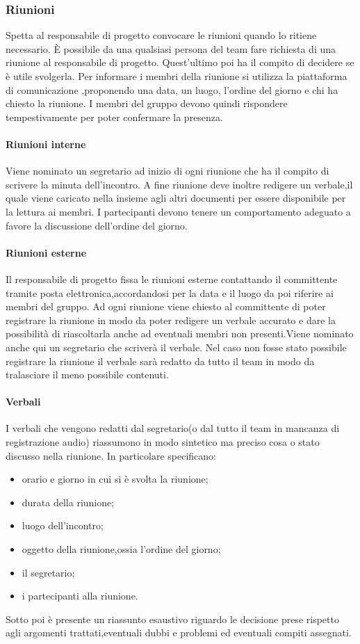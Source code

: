 \subsubsection{Riunioni}
			Spetta al responsabile di progetto convocare le riunioni quando lo ritiene necessario. È possibile da una qualsiasi persona del team fare richiesta di una riunione al responsabile di progetto. Quest'ultimo poi ha il compito di decidere se è utile svolgerla.  Per informare i membri della riunione si utilizza la piattaforma di comunicazione ,proponendo una data, un luogo, l'ordine del giorno e chi ha chiesto la riunione. I membri del gruppo devono quindi rispondere tempestivamente per poter confermare la presenza.
			\paragraph{Riunioni interne}
				Viene nominato un segretario ad inizio di ogni riunione che ha il compito di scrivere la minuta dell'incontro. A fine riunione deve inoltre redigere un verbale,il quale viene caricato nella  insieme agli altri documenti per essere disponibile per la lettura ai membri. I partecipanti devono tenere un comportamento adeguato a favore la discussione dell'ordine del giorno.
			\paragraph{Riunioni esterne}
				Il responsabile di progetto fissa le riunioni esterne contattando il committente tramite posta elettronica,accordandosi per la data e il luogo da poi riferire ai membri del gruppo.
				Ad ogni riunione viene chiesto al committente di poter registrare la riunione in modo da poter redigere un verbale accurato e dare la possibilità di riascoltarla anche ad eventuali membri non presenti.Viene nominato anche qui un segretario che scriverà il verbale. Nel caso non fosse stato possibile registrare la riunione il verbale sarà redatto da tutto il team in modo da tralasciare il meno possibile contenuti.
			\paragraph{Verbali}
				I verbali che vengono redatti dal segretario(o dal tutto il team in mancanza di registrazione audio) riassumono in modo sintetico ma preciso cosa o stato discusso nella riunione. 
				In particolare specificano:
				\begin{itemize}
					\item orario e giorno in cui si è svolta la riunione;
					\item durata della riunione;
					\item luogo dell'incontro;
					\item oggetto della riunione,ossia l'ordine del giorno;
					\item il segretario;
					\item i partecipanti alla riunione.
				\end{itemize}
				Sotto poi è presente un riassunto esaustivo riguardo le decisione prese rispetto agli argomenti trattati,eventuali dubbi e problemi ed eventuali compiti assegnati.

